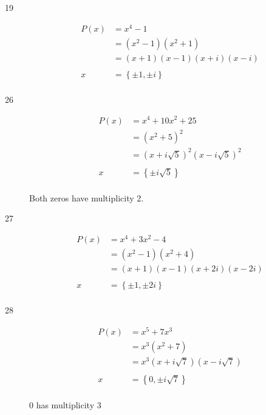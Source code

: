 \documentclass{exam}
\begin{document}
\begin{description}
      \item[19] 
        \begin{align*}
          P(x) &= x^4 - 1 \\
               &= (x^2 - 1)(x^2 + 1) \\
               &= (x + 1)(x - 1)(x + i)(x - i) \\
               \\
          x    &= \boxed{\left\{ \pm 1, \pm i \right\}} \\
        \end{align*}

      \item[26] 
        \begin{align*}
          P(x) &= x^4 + 10x^2 + 25 \\
               &= (x^2 + 5)^2 \\
               &= (x + i \sqrt{5})^2(x - i \sqrt{5})^2  \\
               \\
          x    &= \boxed{\left\{ \pm i \sqrt{5} \right\}} \\
        \end{align*}

        Both zeros have multiplicity 2.

      \item[27] 
        \begin{align*}
          P(x) &= x^4 + 3x^2 - 4 \\
               &= (x^2 - 1)(x^2 + 4) \\
               &= (x + 1)(x - 1)(x + 2i)(x - 2i) \\
               \\
          x    &= \boxed{\left\{ \pm 1, \pm 2i \right\}} \\
        \end{align*}

      \item[28] 
        \begin{align*}
          P(x) &= x^5 + 7x^3 \\
               &= x^3(x^2 + 7) \\
               &= x^3(x + i \sqrt{7})(x - i \sqrt{7}) \\
               \\
          x    &= \boxed{\left\{ 0, \pm i \sqrt{7} \right\}} \\
        \end{align*}

        0 has multiplicity 3


\end{description}
\end{document}
